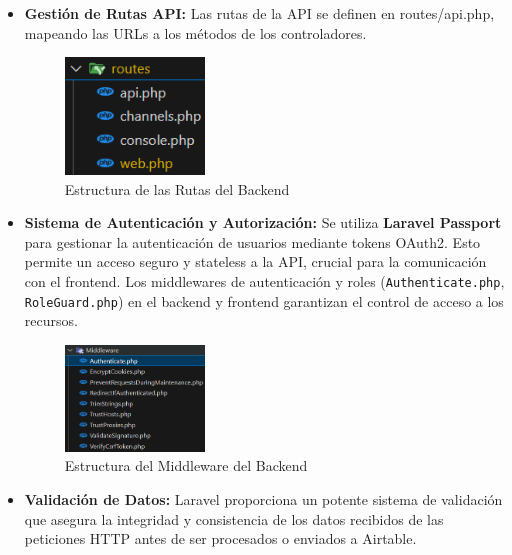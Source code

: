 \begin{itemize}
    \item \textbf{Gestión de Rutas API:} Las rutas de la API se definen en routes/api.php, mapeando las URLs a los métodos de los controladores.

    \begin{figure}[H]
        \begin{center}
            \includegraphics[width = 0.35\textwidth]{Figuras/directoriosbackendroutes.png}
        \end{center}
        \caption{\label{fig:directoriosbackendroutes} Estructura de las Rutas del Backend}
    \end{figure}

\clearpage

    \item \textbf{Sistema de Autenticación y Autorización:} Se utiliza \textbf{Laravel Passport} para gestionar la autenticación de usuarios mediante tokens OAuth2. Esto permite un acceso seguro y stateless a la API, crucial para la comunicación con el frontend. Los middlewares de autenticación y roles (\texttt{Authenticate.php}, \texttt{RoleGuard.php}) en el backend y frontend garantizan el control de acceso a los recursos.

    \begin{figure}[H]
        \begin{center}
            \includegraphics[width = 0.35\textwidth]{Figuras/directoriosbackendmiddleware.png}
        \end{center}
        \caption{\label{fig:directoriosbackendmiddleware} Estructura del Middleware del Backend}
    \end{figure}

    \item \textbf{Validación de Datos:} Laravel proporciona un potente sistema de validación que asegura la integridad y consistencia de los datos recibidos de las peticiones HTTP antes de ser procesados o enviados a Airtable.
\end{itemize}


